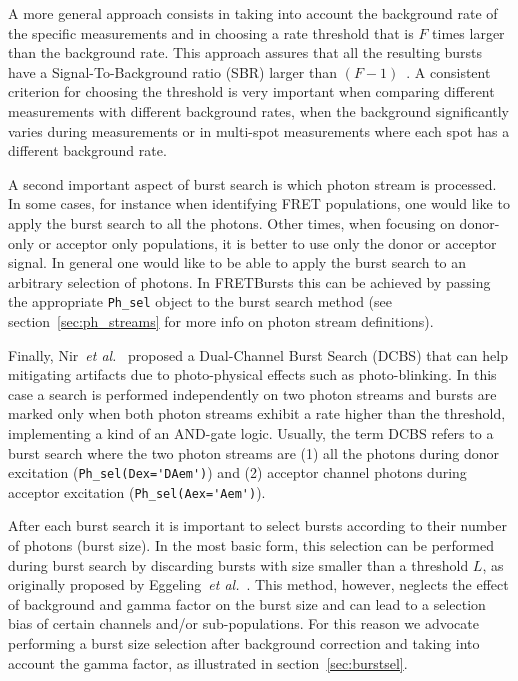 A more general approach consists in taking into account the background rate of
the specific measurements and in choosing a rate threshold that is $F$ times
larger than the background rate. This approach assures that all the resulting bursts
have a Signal-To-Background ratio (SBR) larger than
$(F-1)$~\cite{Michalet_2012}. A consistent criterion for choosing the threshold is
very important when comparing different measurements with different background
rates, when the background significantly varies during measurements or in
multi-spot measurements where each spot has a different background rate.

A second important aspect of burst search is which photon stream is processed.
In some cases, for instance when identifying FRET populations, one would like to
apply the burst search to all the photons. Other times, when focusing on
donor-only or acceptor only populations, it is better to use only the donor or
acceptor signal. In general one would like to be able to apply the burst search
to an arbitrary selection of photons. In FRETBursts this can be achieved by passing
the appropriate \verb|Ph_sel| object to the burst search method (see
section~\ref{sec:ph_streams} for more info on photon stream definitions).

Finally, Nir~\textit{et al.}~\cite{Nir_2006} proposed a Dual-Channel Burst
Search (DCBS) that can help mitigating artifacts due to
photo-physical effects such as photo-blinking. In this case a search is performed
independently on two photon streams and bursts are marked only when both photon
streams exhibit a rate higher than the threshold, 
implementing a kind of an AND-gate logic. 
Usually, the term DCBS refers to a burst search where the two photon streams
are (1) all the photons 
during donor excitation (\verb|Ph_sel(Dex='DAem')|) and (2) acceptor channel photons
during acceptor 
excitation (\verb|Ph_sel(Aex='Aem')|).

After each burst search it is important to select
bursts according to their number of photons (burst size). In the most
basic form, this selection can be performed during burst search by discarding
bursts with size smaller than a threshold $L$, as originally proposed by 
Eggeling~\textit{et al.}~\cite{Eggeling_1998}. 
This method, however, neglects the effect
of background and gamma factor on the burst size and can lead to a selection
bias of certain channels and/or sub-populations. 
For this reason we advocate performing a burst size selection after background
correction and taking into account the gamma factor, as illustrated in
section~\ref{sec:burstsel}.



